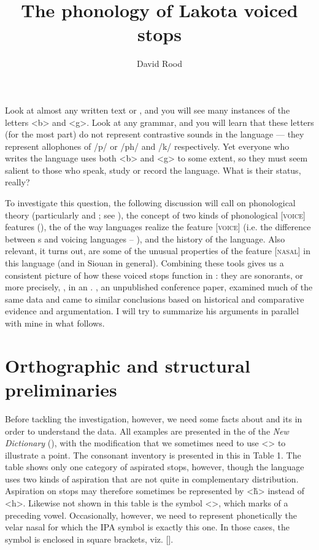 \documentclass[output=paper]{LSP/langsci}
\author{David Rood}
\title{The phonology of {Lakota} voiced stops}
\begin{document}
Look at almost any written  text or , and you will see many instances of the letters <b> and <g>. Look at any  grammar, and you will learn that these letters (for the most part) do not represent contrastive sounds in the language --- they represent allophones of /p/ or /ph/ and /k/ respectively. Yet everyone who writes the language uses both <b> and <g> to some extent, so they must seem salient to those who speak, study or record the language. What is their status, really?
 
To investigate this question, the following discussion will call on phonological theory (particularly  and ; see \citealt{Clements1985}), the concept of two kinds of phonological [\textsc{voice}] features (\citealt{Rice1993}), the  of the way languages realize the feature [\textsc{voice}] (i.e. the difference between s and voicing languages -- \citealt{RingenEtAl2013}), and the history of the language. Also relevant, it turns out, are some of the unusual properties of the feature [\textsc{nasal}] in this language (and in Siouan in general). Combining these tools gives us a consistent picture of how these voiced stops function in : they are sonorants, or more precisely, , in an . \citet{Rankin2001}, an unpublished conference paper, examined much of the same data and came to similar conclusions based on historical and comparative evidence and argumentation. I will try to summarize his arguments in parallel with mine in what follows. 

\section{Orthographic and structural preliminaries}

Before tackling the investigation, however, we need some facts about  and its  in order to understand the data. All examples are presented in the  of the \textit{New  Dictionary} (\citealt{Ullrich2012}), with the modification that we sometimes need to use <> to illustrate a point. The  consonant inventory is presented in this  in Table 1. The table shows only one category of aspirated stops, however, though the language uses two kinds of aspiration that are not quite in complementary distribution. Aspiration on stops may therefore sometimes be represented by <\v{h}> instead of <h>. Likewise not shown in this table is the symbol <>, which marks  of a preceding vowel. Occasionally, however, we need to represent phonetically the velar nasal for which the IPA symbol is exactly this one. In those cases, the symbol is enclosed in square brackets, viz. [].
\end{document}
